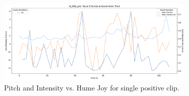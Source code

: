 \medskip

\begin{figure}[H]
    \centering
    
    \includegraphics[width=0.85\textwidth]{png/results/rq3_2/combined_zscore_hume_id_006_pos_4.pdf}
    \caption{Pitch and Intensity vs. Hume Joy for single positive clip.}
    \label{fig:006_pos-anger-joy}
\end{figure}
  
